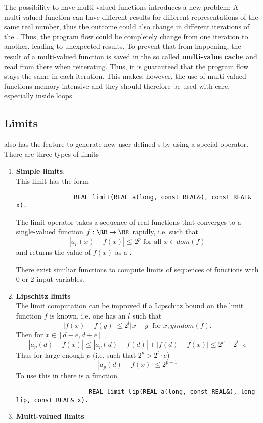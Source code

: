 		The possibility to have multi-valued functions introduces a new problem: 
		A multi-valued function can have different results for different representations of the same real number,
		thus the outcome could also change in different iterations of the \irram. 
		Thus, the program flow could be completely change from one iteration to another, leading to unexpected results.
		To prevent that from happening, the result of a multi-valued function is saved in the so called \textbf{multi-value cache}
		and read from there when reiterating. 
		Thus, it is guaranteed that the program flow stays the same in each iteration.
		This makes, however, the use of multi-valued functions memory-intensive and they should therefore be used with care,
		especially inside loops.
	\subsection{Limits}
		\irram also has the feature to generate new user-defined {\real}s by using a special  operator.
		There are three types of limits
		\begin{enumerate}
			\item \textbf{Simple limits}: \\
			This limit has the form
			\begin{verbatim}
				REAL limit(REAL a(long, const REAL&), const REAL& x).
			\end{verbatim}

			The limit operator takes a sequence of real functions that converges to a single-valued function $f: \RR \to \RR$
			rapidly, i.e. such that 
			$$|a_p(x) - f(x)| \leq 2^p \text{ for all } x \in dom(f)$$
			and returns the value of $f(x)$ as a \real.

			There exist similiar functions to compute limits of sequences of functions with $0$ or $2$ input variables.
			\item \textbf{Lipschitz limits} \\
				The limit computation can be improved if a Lipschitz bound on the limit function $f$ is known, i.e. one has an $l$
				such that
				\begin{equation*}
					| f(x) - f(y) | \leq 2^l | x - y | \text{ for } x,y in dom(f).
				\end{equation*}
				Then for $x \in [d-e, d+e]$  
				$$ | a_p(d) - f(x) | \leq | a_p(d) - f(d) | + | f(d) - f(x) |  \leq 2^p + 2^l \cdot e $$
				Thus for large enough $p$ (i.e. such that $2^p > 2^l \cdot e$)
				$$ | a_p(d) - f(x) | \leq  2^{p+1} $$
				To use this in \irram there is a function
				\begin{verbatim}
					REAL limit_lip(REAL a(long, const REAL&), long lip, const REAL& x).
				\end{verbatim}
			\item \textbf{Multi-valued limits}
		\end{enumerate}
